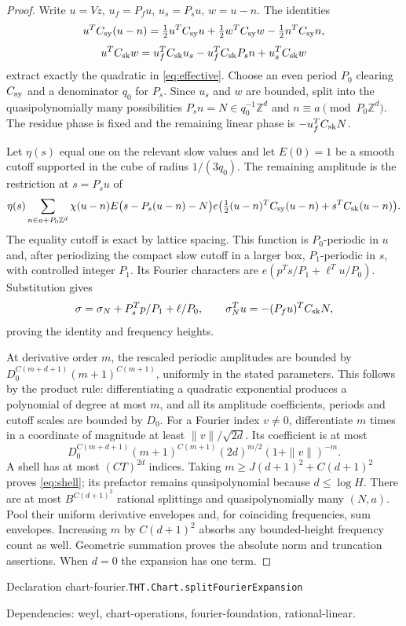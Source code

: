 \documentclass[11pt]{article}
\theoremstyle{definition}
\newcommand{\Z}{\mathbb Z}
\numberwithin{equation}{section}
\newcommand{\bp}[3]{\par\smallskip\begingroup\footnotesize
\noindent\hypertarget{bp:#1}{\textsf{Declaration #1.}}\quad\nolinkurl{#2}\par
\noindent\textsf{Dependencies:} #3.\par\endgroup\smallskip}
\begin{document}
\begin{proof}
Write $u=Vz$, $u_f=P_fu$, $u_s=P_su$, $w=u-n$. The identities
\[
 u^TC_{\rm sy}(u-n)=\tfrac12u^TC_{\rm sy}u+\tfrac12w^TC_{\rm sy}w-\tfrac12n^TC_{\rm sy}n,
\]
\[
 u^TC_{\rm sk}w=u_f^TC_{\rm sk}u_s-u_f^TC_{\rm sk}P_sn+u_s^TC_{\rm sk}w
\]
extract exactly the quadratic in \eqref{eq:effective}. Choose an even period $P_0$ clearing $C_{\rm sy}$ and a denominator $q_0$ for $P_s$. Since $u_s$ and $w$ are bounded, split into the quasipolynomially many possibilities $P_sn=N\in q_0^{-1}\Z^d$ and $n\equiv a\pmod{P_0\Z^d}$. The residue phase is fixed and the remaining linear phase is $-u_f^TC_{\rm sk}N$.

Let $\eta(s)$ equal one on the relevant slow values and let $E(0)=1$ be a smooth cutoff supported in the cube of radius $1/(3q_0)$. The remaining amplitude is the restriction at $s=P_su$ of
\[
 \eta(s)\sum_{n\in a+P_0\Z^d}\chi(u-n)E\bigl(s-P_s(u-n)-N\bigr)
 e\bigl(\tfrac12(u-n)^TC_{\rm sy}(u-n)+s^TC_{\rm sk}(u-n)\bigr).
\]
The equality cutoff is exact by lattice spacing. This function is $P_0$-periodic in $u$ and, after periodizing the compact slow cutoff in a larger box, $P_1$-periodic in $s$, with controlled integer $P_1$. Its Fourier characters are $e(p^Ts/P_1+\ell^Tu/P_0)$. Substitution gives
\[
 \sigma=\sigma_N+P_s^Tp/P_1+\ell/P_0,
 \qquad \sigma_N^Tu=-(P_fu)^TC_{\rm sk}N,
\]
proving the identity and frequency heights.

At derivative order $m$, the rescaled periodic amplitudes are bounded by $D_0^{C(m+d+1)}(m+1)^{C(m+1)}$, uniformly in the stated parameters. This follows by the product rule: differentiating a quadratic exponential produces a polynomial of degree at most $m$, and all its amplitude coefficients, periods and cutoff scales are bounded by $D_0$. For a Fourier index $v\ne0$, differentiate $m$ times in a coordinate of magnitude at least $\|v\|/\sqrt{2d}$. Its coefficient is at most
\[
 D_0^{C(m+d+1)}(m+1)^{C(m+1)}(2d)^{m/2}(1+\|v\|)^{-m}.
\]
A shell has at most $(CT)^{2d}$ indices. Taking $m\ge J(d+1)^2+C(d+1)^2$ proves \eqref{eq:shell}; its prefactor remains quasipolynomial because $d\le\log H$. There are at most $B^{C(d+1)^2}$ rational splittings and quasipolynomially many $(N,a)$. Pool their uniform derivative envelopes and, for coinciding frequencies, sum envelopes. Increasing $m$ by $C(d+1)^2$ absorbs any bounded-height frequency count as well. Geometric summation proves the absolute norm and truncation assertions. When $d=0$ the expansion has one term.
\end{proof}
\bp{chart-fourier}{THT.Chart.splitFourierExpansion}{weyl, chart-operations, fourier-foundation, rational-linear}
\end{document}
